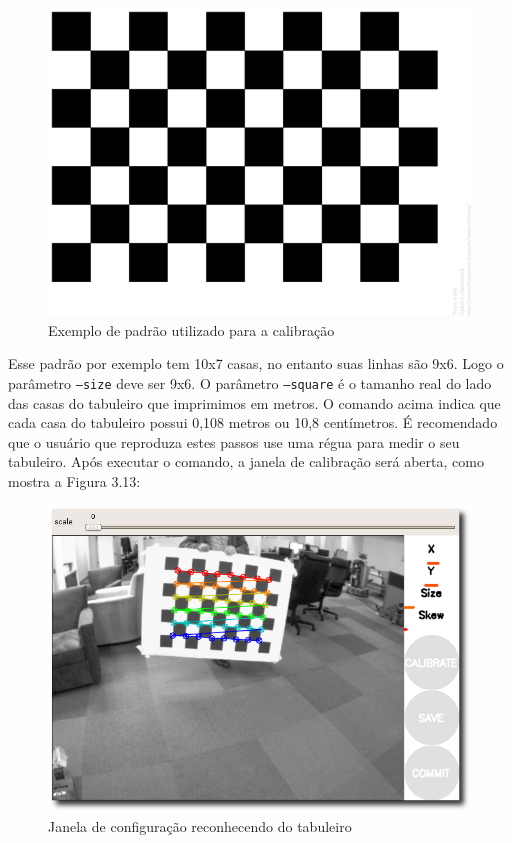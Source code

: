 \begin{figure}[H]
	\centering
		\includegraphics[width= \textwidth]{Imagens/figura3-3E3-12.png}
	\caption{Exemplo de padrão utilizado para a calibração}
	\label{fig3:12}
\end{figure}


Esse padrão por exemplo tem 10x7 casas, no entanto suas linhas são 9x6. Logo o parâmetro \texttt{--size} deve ser 9x6.
O parâmetro \texttt{--square} é o tamanho real do lado das casas do tabuleiro que imprimimos em metros. O comando acima indica que cada casa do tabuleiro possui 0,108 metros ou 10,8 centímetros. É recomendado que o usuário que reproduza estes passos use uma régua para medir o seu tabuleiro.
Após executar o comando, a janela de calibração será aberta, como mostra a Figura 3.13:

\begin{figure}[H]
	\centering
		\includegraphics[width= \textwidth]{Imagens/figura3-13.png}
	\caption{Janela de configuração reconhecendo do tabuleiro \cite{Documentacao-CalibrateMonocularCamera}}
	\label{fig3:13}
\end{figure}

